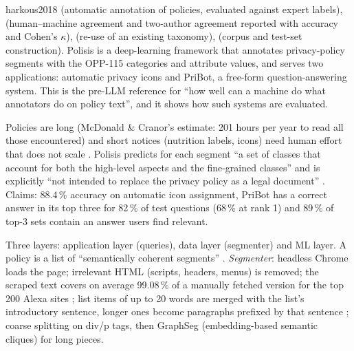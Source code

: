 \begin{papercard}{harkous2018}
  (automatic annotation of policies, evaluated against expert labels),  (human--machine agreement and two-author agreement reported with accuracy and Cohen's $\kappa$),  (re-use of an existing taxonomy),  (corpus and test-set construction). Polisis is a deep-learning framework that annotates privacy-policy segments with the OPP-115 categories and attribute values, and serves two applications: automatic privacy icons and PriBot, a free-form question-answering system. This is the pre-LLM reference for ``how well can a machine do what annotators do on policy text'', and it shows how such systems are evaluated.

 Policies are long (McDonald \& Cranor's estimate: 201 hours per year to read all those encountered) and short notices (nutrition labels, icons) need human effort that does not scale . Polisis predicts for each segment ``a set of classes that account for both the high-level aspects and the fine-grained classes'' and is explicitly ``not intended to replace the privacy policy as a legal document'' . Claims: 88.4\,\% accuracy on automatic icon assignment, PriBot has a correct answer in its top three for 82\,\% of test questions (68\,\% at rank 1) and 89\,\% of top-3 sets contain an answer users find relevant.

 Three layers: application layer (queries), data layer (segmenter) and ML layer. A policy is a list of ``semantically coherent segments'' . \emph{Segmenter}: headless Chrome loads the page; irrelevant HTML (scripts, headers, menus) is removed; the scraped text covers on average 99.08\,\% of a manually fetched version for the top 200 Alexa sites ; list items of up to 20 words are merged with the list's introductory sentence, longer ones become paragraphs prefixed by that sentence ; coarse splitting on div/p tags, then GraphSeg (embedding-based semantic cliques) for long pieces.


\end{papercard}
